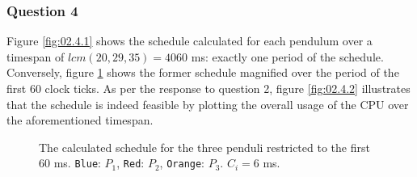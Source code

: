 \subsubsection{Question 4}

Figure \ref{fig:02.4.1} shows the schedule calculated for each pendulum over a
timespan of $lcm(20,29,35) = 4060$ ms: exactly one period of the schedule.
Conversely, figure \ref{fig:02.4.1.small} shows the former schedule magnified
over the period of the first 60 clock ticks.
As per the response to question 2, figure \ref{fig:02.4.2} illustrates that the
schedule is indeed feasible by plotting the overall usage of the CPU over the
aforementioned timespan.


\begin{figure}[H]\centering
  \scalebox{1}{}
  \caption{The calculated schedule for the three penduli restricted to the first
      60 ms. \texttt{Blue}: $P_1$, \texttt{Red}: $P_2$,
      \texttt{Orange}: $P_3$. $C_i = 6$ ms.}
  \label{fig:02.4.1.small}
\end{figure}

\noindent{}
